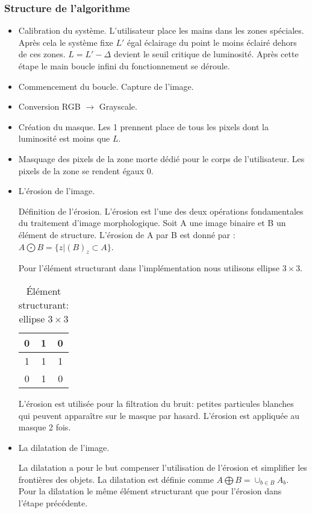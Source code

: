 \subsubsection{Structure de l'algorithme}
\begin{itemize}
\item Calibration du système. L'utilisateur place les mains dans les zones spéciales. Après cela le système fixe $L'$ égal éclairage du point le moins éclairé dehors de ces zones. $L=L'-\Delta$ devient le seuil critique de luminosité. Après cette étape le main boucle infini du fonctionnement se déroule.
\item Commencement du boucle. Capture de l'image.
\item Conversion RGB $\to$ Grayscale. 
\item Création du masque. Les 1 prennent place de tous les pixels dont la luminosité est moins que $L$.
\item Masquage des pixels de la zone morte dédié pour le corps de l'utilisateur. Les pixels de la zone se rendent égaux 0.
\item L'érosion de l'image. 
\par Définition de l'érosion. L'érosion est l'une des deux opérations fondamentales du traitement d'image morphologique. Soit A une image binaire et B un élément de structure. L'érosion de A par B est donné par : $A \bigodot B = \{z|(B)_z \subset A\}$.
\par Pour l'élément structurant dans l'implémentation nous utilisons ellipse $3 \times 3$.
\begin{table}[h]
\centering
\begin{tabular}{|c|c|c|}
\hline
0 & 1 & 0 \\ \hline
1 & 1 & 1 \\ \hline
0 & 1 & 0 \\ \hline
\end{tabular}
\caption{Élément structurant: ellipse $3 \times 3$}
\end{table}
\par L'érosion est utilisée pour la filtration du bruit: petites particules blanches qui peuvent apparaître sur le masque par hasard. L'érosion est appliquée au masque 2 fois.
\item La dilatation de l'image.
\par La dilatation a pour le but compenser l'utilisation de l'érosion et simplifier les frontières des objets. La dilatation est définie comme $A \bigoplus B = \cup_{b \in B}A_b$. Pour la dilatation le même élément structurant que pour l'érosion dans l'étape précédente. 

\end{itemize}
